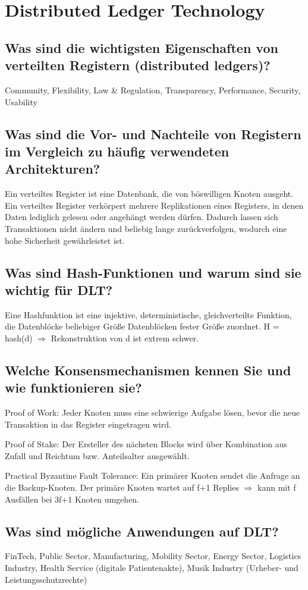 \documentclass{article}
\begin{document}
\section{Distributed Ledger Technology}
\subsection{Was sind die wichtigsten Eigenschaften von verteilten Registern (distributed ledgers)?}
Community, Flexibility, Law \& Regulation, Transparency, Performance, Security, Usability
\subsection{Was sind die Vor- und Nachteile von Registern im Vergleich zu häufig verwendeten Architekturen?}
Ein verteiltes Register ist eine Datenbank, die von böswilligen Knoten ausgeht. Ein verteiltes Register verkörpert mehrere Replikationen eines Registers, in denen Daten lediglich gelesen oder angehängt werden dürfen. Dadurch lassen sich Transaktionen nicht ändern und beliebig lange zurückverfolgen, wodurch eine hohe Sicherheit gewährleistet ist.
\subsection{Was sind Hash-Funktionen und warum sind sie wichtig für DLT?}
Eine Hashfunktion ist eine injektive, deterministische, gleichverteilte Funktion, die Datenblöcke beliebiger Größe Datenblöcken fester Größe zuordnet. H = hash(d) \(\Rightarrow\) Rekonstruktion von d ist extrem schwer.
\subsection{Welche Konsensmechanismen kennen Sie und wie funktionieren sie?}
Proof of Work: Jeder Knoten muss eine schwierige Aufgabe lösen, bevor die neue Transaktion in das Register eingetragen wird.

Proof of Stake: Der Ersteller des nächsten Blocks wird über Kombination aus Zufall und Reichtum bzw. Anteilsalter ausgewählt.

Practical Byzantine Fault Tolerance: Ein primärer Knoten sendet die Anfrage an die Backup-Knoten. Der primäre Knoten wartet auf f+1 Replies \(\Rightarrow\) kann mit f Ausfällen bei 3f+1 Knoten umgehen.
\subsection{Was sind mögliche Anwendungen auf DLT?}
FinTech, Public Sector, Manufacturing, Mobility Sector, Energy Sector, Logistics Industry, Health Service (digitale Patientenakte), Musik Industry (Urheber- und Leistungsschutzrechte)
\end{document}
